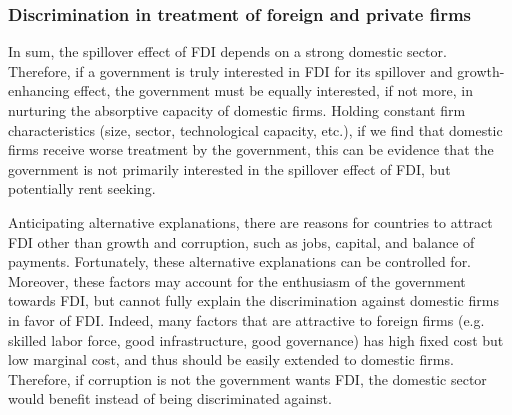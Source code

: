 \subsubsection{Discrimination in treatment of foreign and private firms}

In sum, the spillover effect of FDI depends on a strong domestic sector. Therefore, if a government is truly interested in FDI for its spillover and growth-enhancing effect, the government must be equally interested, if not more, in nurturing the absorptive capacity of domestic firms. Holding constant firm characteristics (size, sector, technological capacity, etc.), if we find that domestic firms receive worse treatment by the government, this can be evidence that the government is not primarily interested in the spillover effect of FDI, but potentially rent seeking.

Anticipating alternative explanations, there are reasons for countries to attract FDI other than growth and corruption, such as jobs, capital, and balance of payments. Fortunately, these alternative explanations can be controlled for. Moreover, these factors may account for the enthusiasm of the government towards FDI, but cannot fully explain the discrimination against domestic firms in favor of FDI. Indeed, many factors that are attractive to foreign firms (e.g. skilled labor force, good infrastructure, good governance) has high fixed cost but low marginal cost, and thus should be easily extended to domestic firms. Therefore, if corruption is not the government wants FDI, the domestic sector would benefit instead of being discriminated against.
